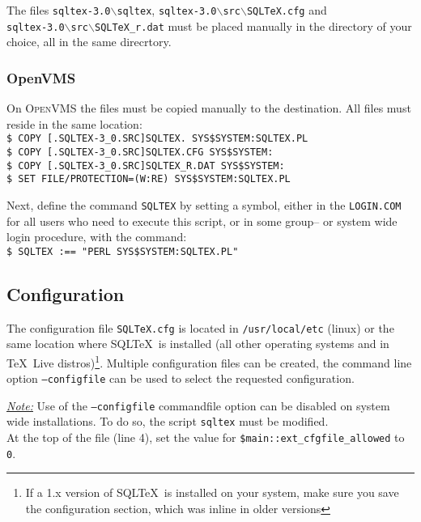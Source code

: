 \documentclass{article}
\newcommand{\vs}{\vspace{3mm}}
\newcommand{\sqltexversion}{3.0}
\newcommand{\sqltexvmsversion}{3\_0}
\begin{document}
\vs

The files \texttt{sqltex-\sqltexversion\ensuremath{\backslash}sqltex}, \texttt{sqltex-\sqltexversion\ensuremath{\backslash}src\ensuremath{\backslash}SQLTeX.cfg} and \\ \texttt{sqltex-\sqltexversion\ensuremath{\backslash}src\ensuremath{\backslash}SQLTeX\_r.dat} must be placed manually in the directory of your choice, all in the same direcrtory.


\subsubsection{OpenVMS}

On \textsc{OpenVMS} the files must be copied manually to the destination. All files must reside in the same location:\\
\texttt{\$ COPY [.SQLTEX-\sqltexvmsversion.SRC]SQLTEX. SYS\$SYSTEM:SQLTEX.PL\\
\$ COPY [.SQLTEX-\sqltexvmsversion.SRC]SQLTEX.CFG SYS\$SYSTEM:\\
\$ COPY [.SQLTEX-\sqltexvmsversion.SRC]SQLTEX\_R.DAT SYS\$SYSTEM:\\
\$ SET FILE/PROTECTION=(W:RE) SYS\$SYSTEM:SQLTEX.PL}

\vs

Next, define the command \texttt{SQLTEX} by setting a symbol,
either in the \texttt{LOGIN.COM} for all users who need to execute this script, or in some group-- or
system wide login procedure, with the command:  \\
\texttt{\$ SQLTEX :== "PERL SYS\$SYSTEM:SQLTEX.PL"} 

\subsection{Configuration}\label{config}

The configuration file \texttt{SQLTeX.cfg} is located in \texttt{/usr/local/etc} (linux) or the same location where SQL\TeX\ is installed (all other operating systems and in \TeX\ Live distros)\footnote{ If a 1.x version of SQL\TeX\ is installed on your system, make sure you save the configuration section, which was inline in older versions}.
Multiple configuration files can be created, the command line option \texttt{--configfile} can be used to
select the requested configuration.

\vs

\noindent\hspace{-3mm}\textit{\underline{Note:}}\label{cfg:disable} Use of the \texttt{--configfile} commandfile option can be disabled on system wide installations. To do so, the script \texttt{sqltex} must be modified.\\
At the top of the file (line 4), set the value for \texttt{\$main::ext\_cfgfile\_allowed} to \texttt{0}.
\end{document}

